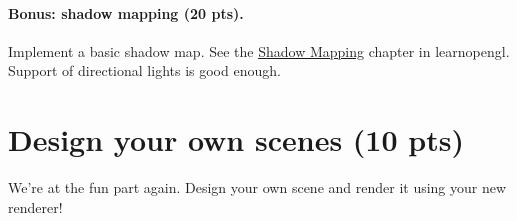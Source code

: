 \paragraph{Bonus: shadow mapping (20 pts).} Implement a basic shadow map. See the \href{https://learnopengl.com/Advanced-Lighting/Shadows/Shadow-Mapping}{Shadow Mapping} chapter in learnopengl. Support of directional lights is good enough. 

\section{Design your own scenes (10 pts)}
We're at the fun part again. Design your own scene and render it using your new renderer!

%
%


